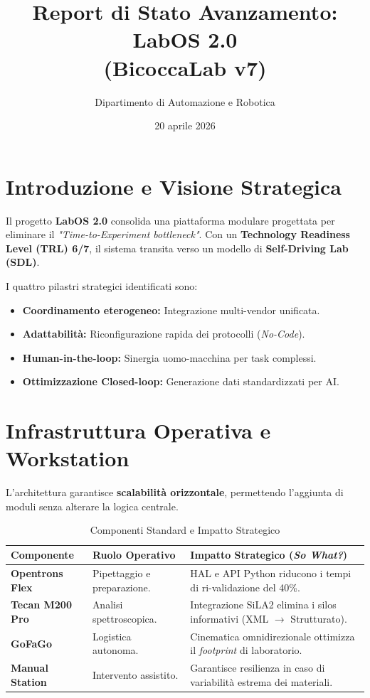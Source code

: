\documentclass[a4paper,11pt]{article}
\title{\textbf{Report di Stato Avanzamento: LabOS 2.0}\\ \large (BicoccaLab v7)}
\author{Dipartimento di Automazione e Robotica}
\date{20 aprile 2026}
\begin{document}
	
	\maketitle
	
	\section{Introduzione e Visione Strategica}
	Il progetto \textbf{LabOS 2.0} consolida una piattaforma modulare progettata per eliminare il \textit{"Time-to-Experiment bottleneck"}. Con un \textbf{Technology Readiness Level (TRL) 6/7}, il sistema transita verso un modello di \textbf{Self-Driving Lab (SDL)}.
	
	I quattro pilastri strategici identificati sono:
	\begin{itemize}[label=$\checkmark$]
		\item \textbf{Coordinamento eterogeneo:} Integrazione multi-vendor unificata.
		\item \textbf{Adattabilità:} Riconfigurazione rapida dei protocolli (\textit{No-Code}).
		\item \textbf{Human-in-the-loop:} Sinergia uomo-macchina per task complessi.
		\item \textbf{Ottimizzazione Closed-loop:} Generazione dati standardizzati per AI.
	\end{itemize}
	
	\section{Infrastruttura Operativa e Workstation}
	L'architettura garantisce \textbf{scalabilità orizzontale}, permettendo l'aggiunta di moduli senza alterare la logica centrale.
	
	
	
	\begin{table}[h!]
		\centering
		\small
		\caption{Componenti Standard e Impatto Strategico}
		\vspace{2mm}
		\begin{tabular}{@{}p{3cm}p{4cm}p{7cm}@{}}
			\toprule
			\textbf{Componente} & \textbf{Ruolo Operativo} & \textbf{Impatto Strategico (\textit{So What?})} \\ \midrule
			\textbf{Opentrons Flex} & Pipettaggio e preparazione. & HAL e API Python riducono i tempi di ri-validazione del 40\%. \\ \addlinespace
			\textbf{Tecan M200 Pro} & Analisi spettroscopica. & Integrazione SiLA2 elimina i silos informativi (XML $\to$ Strutturato). \\ \addlinespace
			\textbf{GoFaGo} & Logistica autonoma. & Cinematica omnidirezionale ottimizza il \textit{footprint} di laboratorio. \\ \addlinespace
			\textbf{Manual Station} & Intervento assistito. & Garantisce resilienza in caso di variabilità estrema dei materiali. \\ \bottomrule
		\end{tabular}
	\end{table}
	
\end{document}

